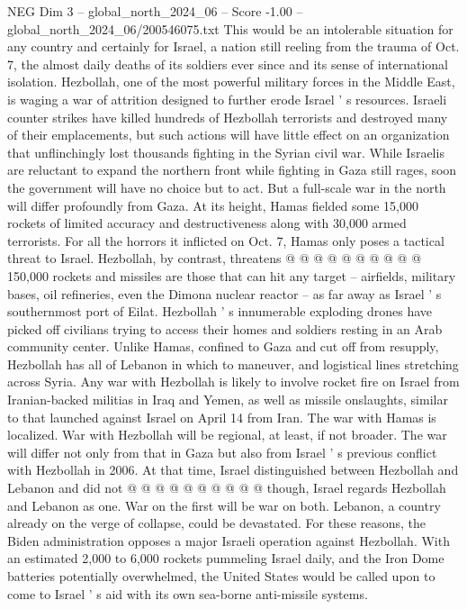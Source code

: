 \begin{textsample}{NEG Dim 3 – global\_north\_2024\_06 – Score -1.00 – global\_north\_2024\_06/200546075.txt}  \label{ex:f3_neg_379}
This would be an intolerable situation for any country and certainly for Israel, a nation still reeling from the trauma of Oct. 7, the almost daily deaths of its soldiers ever since and its sense of international isolation.
Hezbollah, one of the most powerful military forces in the Middle East, is waging a war of attrition designed to further erode Israel ' s resources.
Israeli counter strikes have killed hundreds of Hezbollah terrorists and destroyed many of their emplacements, but such actions will have little effect on an organization that unflinchingly lost thousands fighting in the Syrian civil war.
While Israelis are reluctant to expand the northern front while fighting in Gaza still rages, soon the government will have no choice but to act.
But a full-scale war in the north will differ profoundly from Gaza.
At its height, Hamas fielded some 15,000 rockets of limited accuracy and destructiveness along with 30,000 armed terrorists.
For all the horrors it inflicted on Oct. 7, Hamas only poses a tactical threat to Israel.
Hezbollah, by contrast, threatens @ @ @ @ @ @ @ @ @ @ 150,000 rockets and missiles are those that can hit any target -- airfields, military bases, oil refineries, even the Dimona nuclear reactor -- as far away as Israel ' s southernmost port of Eilat.
Hezbollah ' s innumerable exploding drones have picked off civilians trying to access their homes and soldiers resting in an Arab community center.
Unlike Hamas, confined to Gaza and cut off from resupply, Hezbollah has all of Lebanon in which to maneuver, and logistical lines stretching across Syria.
Any war with Hezbollah is likely to involve rocket fire on Israel from Iranian-backed militias in Iraq and Yemen, as well as missile onslaughts, similar to that launched against Israel on April 14 from Iran.
The war with Hamas is localized.
War with Hezbollah will be regional, at least, if not broader.
The war will differ not only from that in Gaza but also from Israel ' s previous conflict with Hezbollah in 2006.
At that time, Israel distinguished between Hezbollah and Lebanon and did not @ @ @ @ @ @ @ @ @ @ though, Israel regards Hezbollah and Lebanon as one.
War on the first will be war on both.
Lebanon, a country already on the verge of collapse, could be devastated.
For these reasons, the Biden administration opposes a major Israeli operation against Hezbollah.
With an estimated 2,000 to 6,000 rockets pummeling Israel daily, and the Iron Dome batteries potentially overwhelmed, the United States would be called upon to come to Israel ' s aid with its own sea-borne anti-missile systems.

\end{textsample}
